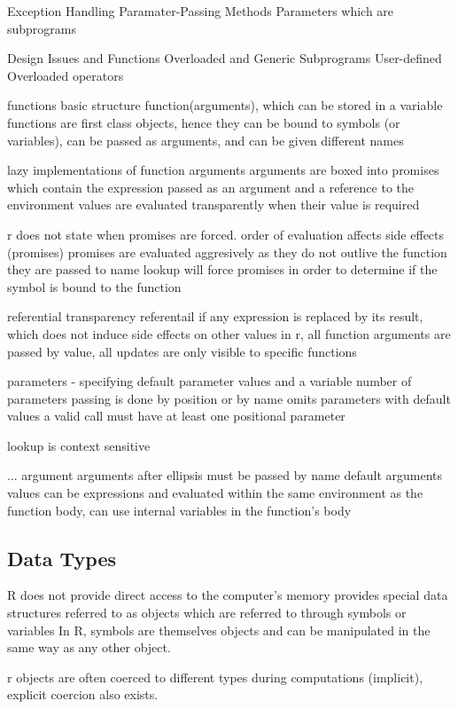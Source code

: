 \documentclass[12pt]{article}
\begin{document}
Exception Handling
Paramater-Passing Methods
Parameters which are subprograms

Design Issues and Functions
Overloaded and Generic Subprograms
User-defined Overloaded operators

functions
basic structure
function(arguments), which can be stored in a variable
functions are first class objects, hence they can be bound to symbols (or variables), can be passed as arguments, and can be given different names

lazy implementations of function arguments
arguments are boxed into promises which contain the expression passed as an argument and a reference to the environment
values are evaluated transparently when their value is required

r does not state when promises are forced.
order of evaluation affects side effects (promises)
promises are evaluated aggresively as they do not outlive the function they are passed to
name lookup will force promises in order to determine if the symbol is bound to the function

referential transparency
referentail if any expression is replaced by its result, which does not induce side effects on other values
in r, all function arguments are passed by value, all updates are only visible to specific functions

parameters - specifying default parameter values and a variable number of parameters
passing is done by position or by name
omits parameters with default values
a valid call must have at least one positional parameter

lookup is context sensitive

... argument
arguments after ellipsis must be passed by name
default arguments values can be expressions and evaluated within the same environment as the function body, can use internal variables in the function's body

\iffalse
\subsection{Data Types}
R does not provide direct access to the computer's memory
provides special data structures referred to as objects
which are referred to through symbols or variables
In R, symbols are themselves objects and can be manipulated in the same way as any other object.

r objects are often coerced to different types during computations (implicit), explicit coercion also exists.
\end{document}
